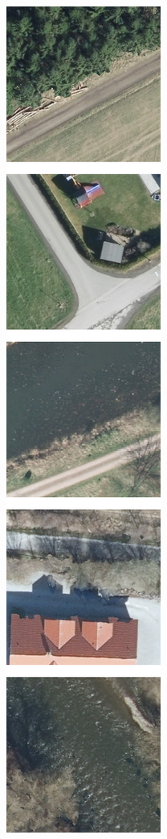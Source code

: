 \begin{figure}[h]
    \newcommand{\WnetPredictionsImageWidth}{0.18\textwidth}
    \centering

    \begin{subfigure}{0.0866\textwidth}
        \includegraphics[width=\textwidth]{images/wnet/original}

\end{subfigure}
\end{figure}
